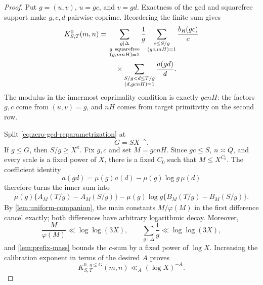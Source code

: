 \begin{proof}
Put \(g=(u,v)\), \(u=gc\), and \(v=gd\).  Exactness of the gcd and
squarefree support make \(g,c,d\) pairwise coprime.  Reordering the
finite sum gives
\begin{align}
 K^0_{S,T}(m,n)
 ={}&
 \sum_{\substack{g\mid\Delta\\g\ \mathrm{squarefree}\\
                  (g,mnH)=1}}\frac1g
 \sum_{\substack{c\le S/g\\(gc,mH)=1}}
 \frac{b_R(gc)}c
 \notag\\
 &\quad\times
 \sum_{\substack{S/g<d\le T/g\\(d,gcnH)=1}}
 \frac{a(gd)}d.
 \label{eq:zero-gcd-reparametrization}
\end{align}
The modulus in the innermost coprimality condition is exactly
\(gcnH\): the factors \(g,c\) come from \((u,v)=g\), and \(nH\)
comes from target primitivity on the second row.

Split \eqref{eq:zero-gcd-reparametrization} at
\begin{equation}
 G=SX^{-\kappa}.
 \label{eq:g-split}
\end{equation}
If \(g\le G\), then \(S/g\ge X^\kappa\).  Fix \(g,c\) and set
\(M=gcnH\).  Since \(gc\le S\), \(n\asymp Q\), and every scale is a
fixed power of \(X\), there is a fixed \(C_0\) such that
\(M\le X^{C_0}\).  The coefficient identity
\begin{equation}
 a(gd)=\mu(g)a(d)-\mu(g)\log g\,\mu(d)
 \label{eq:a-gd-split}
\end{equation}
therefore turns the inner sum into
\begin{align}
 \mu(g)\{A_M(T/g)-A_M(S/g)\}
 -\mu(g)\log g\{B_M(T/g)-B_M(S/g)\}.
 \label{eq:inner-endpoint-difference}
\end{align}
By \cref{lem:uniform-companion}, the main constants
\(M/\varphi(M)\) in the first difference cancel exactly; both
differences have arbitrary logarithmic decay.  Moreover,
\[
 \frac M{\varphi(M)}\ll\log\log(3X),\qquad
 \sum_{g\mid\Delta}\frac1g\ll\log\log(3X),
\]
and \cref{lem:prefix-mass} bounds the \(c\)-sum by a fixed power of
\(\log X\).  Increasing the calibration exponent in terms of the
desired \(A\) proves
\begin{equation}
 K^{0,\,g\le G}_{S,T}(m,n)\ll_A(\log X)^{-A}.
 \label{eq:small-g-zero}
\end{equation}


\end{proof}

